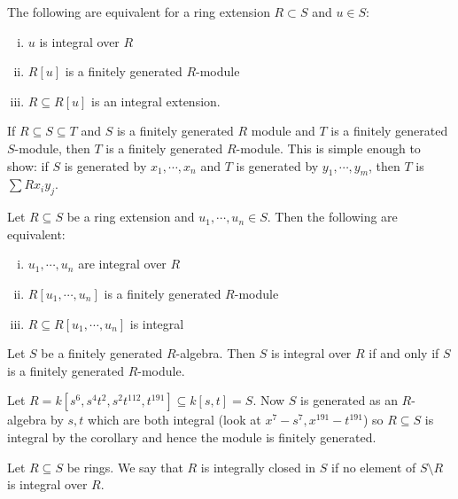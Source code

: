 \begin{cor}
The following are equivalent for a ring extension $R \subset S$ and $u \in S$:
\begin{enumerate}[(i)]
\item $u$ is integral over $R$
\item $R[u]$ is a finitely generated $R$-module
\item $R \subseteq R[u]$ is an integral extension. 
\end{enumerate}
\end{cor}

\begin{rem}
If $R \subseteq S \subseteq T$ and $S$ is a finitely generated $R$ module and $T$ is a finitely generated $S$-module, then $T$ is a finitely generated $R$-module. This is simple enough to show: if $S$ is generated by $x_1,\cdots,x_n$ and $T$ is generated by $y_1,\cdots,y_m$, then $T$ is $\sum Rx_i y_j$. 
\end{rem}

\begin{cor}
Let $R \subseteq S$ be a ring extension and $u_1,\cdots,u_n \in S$. Then the following are equivalent:
\begin{enumerate}[(i)]
\item $u_1,\cdots,u_n$ are integral over $R$
\item $R[u_1,\cdots,u_n]$ is a finitely generated $R$-module
\item $R \subseteq R[u_1,\cdots,u_n]$ is integral
\end{enumerate}
\end{cor}

\begin{cor}
Let $S$ be a finitely generated $R$-algebra. Then $S$ is integral over $R$ if and only if $S$ is a finitely generated $R$-module. 
\end{cor}

\begin{ex}
Let $R=k[s^6,s^4t^2,s^2t^{112},t^{191}] \subseteq k[s,t]=S$. Now $S$ is generated as an $R$-algebra by $s,t$ which are both integral (look at $x^7-s^7, x^{191}-t^{191}$) so $R \subseteq S$ is integral by the corollary and hence the module is finitely generated. 
\end{ex}

\begin{dfn}
Let $R \subseteq S$ be rings. We say that $R$ is integrally closed in $S$ if no element of $S \setminus R$ is integral over $R$. 
\end{dfn}

